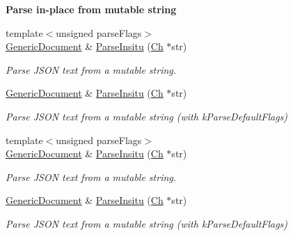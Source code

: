 \begin{Indent}{\bf Parse in-\/place from mutable string}\par
\begin{DoxyCompactItemize}
\item 
{\footnotesize template$<$unsigned parse\+Flags$>$ }\\\hyperlink{class_generic_document}{Generic\+Document} \& \hyperlink{class_generic_document_a301f8f297a5a0da4b6be5459ad766f75}{Parse\+Insitu} (\hyperlink{class_generic_value_ade0e0ce64ccd5d852da57a35e720bafb}{Ch} $\ast$str)
\begin{DoxyCompactList}\small\item\em Parse J\+S\+ON text from a mutable string. \end{DoxyCompactList}\item 
\hyperlink{class_generic_document}{Generic\+Document} \& \hyperlink{class_generic_document_a81922881357539d5482d31aea14b5664}{Parse\+Insitu} (\hyperlink{class_generic_value_ade0e0ce64ccd5d852da57a35e720bafb}{Ch} $\ast$str)
\begin{DoxyCompactList}\small\item\em Parse J\+S\+ON text from a mutable string (with k\+Parse\+Default\+Flags) \end{DoxyCompactList}\item 
{\footnotesize template$<$unsigned parse\+Flags$>$ }\\\hyperlink{class_generic_document}{Generic\+Document} \& \hyperlink{class_generic_document_a301f8f297a5a0da4b6be5459ad766f75}{Parse\+Insitu} (\hyperlink{class_generic_value_ade0e0ce64ccd5d852da57a35e720bafb}{Ch} $\ast$str)
\begin{DoxyCompactList}\small\item\em Parse J\+S\+ON text from a mutable string. \end{DoxyCompactList}\item 
\hyperlink{class_generic_document}{Generic\+Document} \& \hyperlink{class_generic_document_a81922881357539d5482d31aea14b5664}{Parse\+Insitu} (\hyperlink{class_generic_value_ade0e0ce64ccd5d852da57a35e720bafb}{Ch} $\ast$str)
\begin{DoxyCompactList}\small\item\em Parse J\+S\+ON text from a mutable string (with k\+Parse\+Default\+Flags) \end{DoxyCompactList}\end{DoxyCompactItemize}
\end{Indent}
